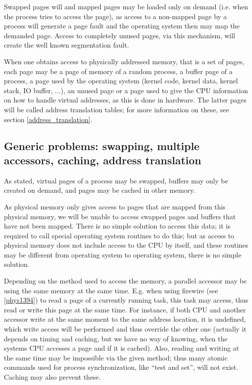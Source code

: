Swapped pages will and mapped pages may be loaded only on demand (i.e\@. when
the process tries to access the page), as access to a non-mapped page by a
process will generate a page fault and the operating system then may map the
demanded page. Access to completely unused pages, via this mechanism, will
create the well known segmentation fault.

When one obtains access to physically addressed memory, that is a set of pages,
each page may be a page of memory of a random process, a buffer page of a
process, a page used by the operating system (kernel code, kernel data, kernel
stack, IO buffer, ...), an unused page or a page used to give the CPU
information on how to handle virtual addresses, as this is done in hardware.
The latter pages will be called address translation tables; for more information
on these, see section \ref{address_translation}.

\pagebreak

\subsection{Generic problems: swapping, multiple accessors, caching, address
translation}

As stated, virtual pages of a process may be swapped, buffers may only be
created on demand, and pages may be cached in other memory.

As physical memory only gives access to pages that are mapped from this
physical memory, we will be unable to access swapped pages and buffers that
have not been mapped. There is no simple solution to access this data; it is
required to call special operating system routines to do this; but as access to
physical memory does not include access to the CPU by itself, and these
routines may be different from operating system to operating system, there is
no simple solution.

Depending on the method used to access the memory, a parallel accessor may be
using the same memory at the same time. E.g\@. when using firewire (see
\ref{phys1394}) to read a page of a currently running task, this task may
access, thus read or write this page at the same time. For instance, if both CPU
and another accessor write at the same moment to the same address location, it
is undefined, which write access will be performed and thus override the other
one (actually it depends on timing and caching, but we have no way of knowing,
when the systems CPU accesses a page and if it is cached). Also, reading and
writing at the same time may be impossible via the given method; thus many
atomic commands used for process synchronization, like ``test and set'', will
not exist. Caching may also prevent these.

